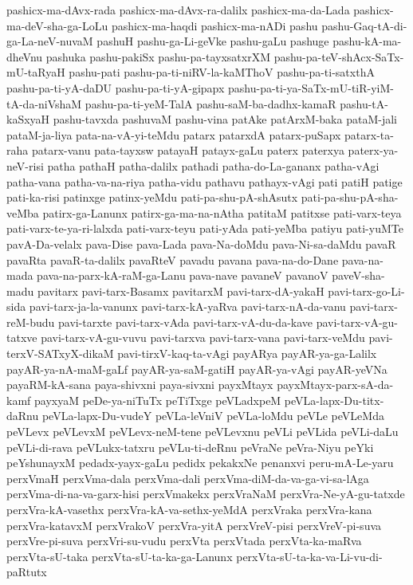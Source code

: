 {pashicx-ma-dAvx-rada
pashicx-ma-dAvx-ra-dalilx
pashicx-ma-da-Lada
pashicx-ma-deV-sha-ga-LoLu
pashicx-ma-haqdi
pashicx-ma-nADi
pashu
pashu-Gaq-tA-di-ga-La-neV-nuvaM
pashuH
pashu-ga-Li-geVke
pashu-gaLu
pashuge
pashu-kA-ma-dheVnu
pashuka
pashu-pakiSx
pashu-pa-tayxsatxrXM
pashu-pa-teV-shAcx-SaTx-mU-taRyaH
pashu-pati
pashu-pa-ti-niRV-la-kaMThoV
pashu-pa-ti-satxthA
pashu-pa-ti-yA-daDU
pashu-pa-ti-yA-gipapx
pashu-pa-ti-ya-SaTx-mU-tiR-yiM-tA-da-niVshaM
pashu-pa-ti-yeM-TalA
pashu-saM-ba-dadhx-kamaR
pashu-tA-kaSxyaH
pashu-tavxda
pashuvaM
pashu-vina
patAke
patArxM-baka
pataM-jali
pataM-ja-liya
pata-na-vA-yi-teMdu
patarx
patarxdA
patarx-puSapx
patarx-ta-raha
patarx-vanu
pata-tayxsw
patayaH
patayx-gaLu
paterx
paterxya
paterx-ya-neV-risi
patha
pathaH
patha-dalilx
pathadi
patha-do-La-gananx
patha-vAgi
patha-vana
patha-va-na-riya
patha-vidu
pathavu
pathayx-vAgi
pati
patiH
patige
pati-ka-risi
patinxge
patinx-yeMdu
pati-pa-shu-pA-shAsutx
pati-pa-shu-pA-sha-veMba
patirx-ga-Lanunx
patirx-ga-ma-na-nAtha
patitaM
patitxse
pati-varx-teya
pati-varx-te-ya-ri-lalxda
pati-varx-teyu
pati-yAda
pati-yeMba
patiyu
pati-yuMTe
pavA-Da-velalx
pava-Dise
pava-Lada
pava-Na-doMdu
pava-Ni-sa-daMdu
pavaR
pavaRta
pavaR-ta-dalilx
pavaRteV
pavadu
pavana
pava-na-do-Dane
pava-na-mada
pava-na-parx-kA-raM-ga-Lanu
pava-nave
pavaneV
pavanoV
paveV-sha-madu
pavitarx
pavi-tarx-Basamx
pavitarxM
pavi-tarx-dA-yakaH
pavi-tarx-go-Li-sida
pavi-tarx-ja-la-vanunx
pavi-tarx-kA-yaRva
pavi-tarx-nA-da-vanu
pavi-tarx-reM-budu
pavi-tarxte
pavi-tarx-vAda
pavi-tarx-vA-du-da-kave
pavi-tarx-vA-gu-tatxve
pavi-tarx-vA-gu-vuvu
pavi-tarxva
pavi-tarx-vana
pavi-tarx-veMdu
pavi-terxV-SATxyX-dikaM
pavi-tirxV-kaq-ta-vAgi
payARya
payAR-ya-ga-Lalilx
payAR-ya-nA-maM-gaLf
payAR-ya-saM-gatiH
payAR-ya-vAgi
payAR-yeVNa
payaRM-kA-sana
paya-shivxni
paya-sivxni
payxMtayx
payxMtayx-parx-sA-da-kamf
payxyaM
peDe-ya-niTuTx
peTiTxge
peVLadxpeM
peVLa-lapx-Du-titx-daRnu
peVLa-lapx-Du-vudeY
peVLa-leVniV
peVLa-loMdu
peVLe
peVLeMda
peVLevx
peVLevxM
peVLevx-neM-tene
peVLevxnu
peVLi
peVLida
peVLi-daLu
peVLi-di-rava
peVLukx-tatxru
peVLu-ti-deRnu
peVraNe
peVra-Niyu
peYki
peYshunayxM
pedadx-yayx-gaLu
pedidx
pekakxNe
penanxvi
peru-mA-Le-yaru
perxVmaH
perxVma-dala
perxVma-dali
perxVma-diM-da-va-ga-vi-sa-lAga
perxVma-di-na-va-garx-hisi
perxVmakekx
perxVraNaM
perxVra-Ne-yA-gu-tatxde
perxVra-kA-vasethx
perxVra-kA-va-sethx-yeMdA
perxVraka
perxVra-kana
perxVra-katavxM
perxVrakoV
perxVra-yitA
perxVreV-pisi
perxVreV-pi-suva
perxVre-pi-suva
perxVri-su-vudu
perxVta
perxVtada
perxVta-ka-maRva
perxVta-sU-taka
perxVta-sU-ta-ka-ga-Lanunx
perxVta-sU-ta-ka-va-Li-vu-di-paRtutx
}
